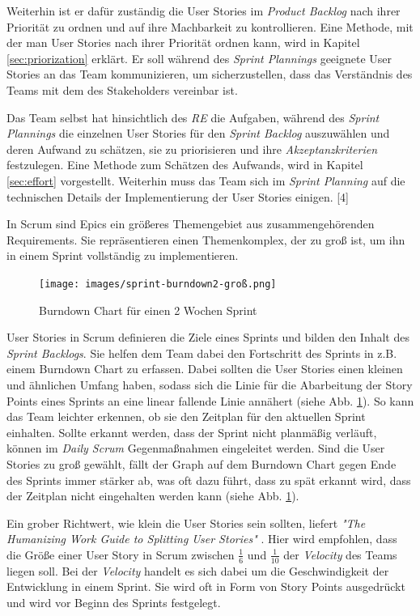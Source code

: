 \documentclass[acmtog]{acmart}
\begin{document}
Weiterhin ist er dafür zuständig die User Stories im \emph{Product Backlog} nach ihrer Priorität zu ordnen und auf ihre Machbarkeit 
zu kontrollieren. Eine Methode, mit der man User Stories nach ihrer Priorität ordnen kann, wird in Kapitel \ref{sec:priorization} erklärt. 
Er soll während des \emph{Sprint Plannings} geeignete User Stories an das Team kommunizieren, um sicherzustellen, dass das Verständnis 
des Teams mit dem des Stakeholders vereinbar ist. \cite{reinscrum}

Das Team selbst hat hinsichtlich des \emph{RE} die Aufgaben, während des \emph{Sprint Plannings} die einzelnen User Stories für den \emph{Sprint 
Backlog} auszuwählen und deren Aufwand zu schätzen, sie zu priorisieren und ihre \emph{Akzeptanzkriterien} festzulegen. Eine Methode zum Schätzen des Aufwands, wird in Kapitel \ref{sec:effort} vorgestellt. 
Weiterhin muss das Team sich im \emph{Sprint Planning} auf die technischen Details der Implementierung der User Stories einigen. [4]

In Scrum sind Epics ein größeres Themengebiet aus zusammengehörenden Requirements. Sie repräsentieren einen Themenkomplex, der 
zu groß ist, um ihn in einem Sprint vollständig zu implementieren. \cite{reinscrum}

\begin{figure}[t]
  \centering
  \texttt{[image: images/sprint-burndown2-groß.png]}
  \caption{Burndown Chart für einen 2 Wochen Sprint}
    \label{fig:burndownchart}
  \Description{}
\end{figure}

User Stories in Scrum definieren die Ziele eines Sprints und bilden den Inhalt des \emph{Sprint Backlogs}. Sie helfen dem Team dabei den Fortschritt 
des Sprints in z.B. einem Burndown Chart zu erfassen. Dabei sollten die User Stories einen kleinen und ähnlichen Umfang haben, sodass 
sich die Linie für die Abarbeitung der Story Points eines Sprints an eine linear fallende Linie annähert (siehe Abb. \ref{fig:burndownchart}). So kann das 
Team leichter erkennen, ob sie den Zeitplan für den aktuellen Sprint einhalten. Sollte erkannt werden, dass der Sprint nicht planmäßig verläuft, können im 
\emph{Daily Scrum} Gegenmaßnahmen eingeleitet werden. Sind die User Stories zu groß gewählt, fällt der 
Graph auf dem Burndown Chart gegen Ende des Sprints immer stärker ab, was oft dazu führt, dass zu spät erkannt wird, dass der Zeitplan 
nicht eingehalten werden kann (siehe Abb. \ref{fig:burndownchart}). \cite{reinscrum} 

Ein grober Richtwert, wie klein die User Stories sein sollten, liefert \emph{"The Humanizing Work Guide to Splitting User Stories"} \cite{humanizingwork}. Hier wird empfohlen, dass die Größe einer User Story in 
Scrum zwischen \( \frac{1}{6} \) und \( \frac{1}{10} \) der \emph{Velocity} des Teams liegen soll. Bei der \emph{Velocity} handelt 
es sich dabei um die Geschwindigkeit der Entwicklung in einem Sprint. Sie wird oft in Form von Story Points ausgedrückt und wird vor 
Beginn des Sprints festgelegt. \cite{humanizingwork}
\end{document}
